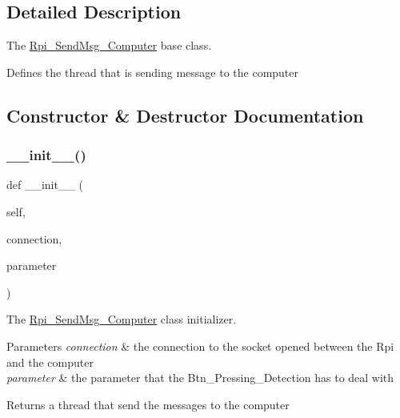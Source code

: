 \subsection{Detailed Description}
The \hyperlink{a00045}{Rpi\+\_\+\+Send\+Msg\+\_\+\+Computer} base class. 

Defines the thread that is sending message to the computer 

\subsection{Constructor \& Destructor Documentation}
\mbox{\label{a00045_ab31bcaed710c978236824fea1cc5c9f4}} 
\subsubsection{\texorpdfstring{\+\_\+\+\_\+init\+\_\+\+\_\+()}{\_\_init\_\_()}}
{\footnotesize\ttfamily def \+\_\+\+\_\+init\+\_\+\+\_\+ (\begin{DoxyParamCaption}\item[{}]{self,  }\item[{}]{connection,  }\item[{}]{parameter }\end{DoxyParamCaption})}



The \hyperlink{a00045}{Rpi\+\_\+\+Send\+Msg\+\_\+\+Computer} class initializer. 


\begin{DoxyParams}{Parameters}
{\em connection} & the connection to the socket opened between the Rpi and the computer \\
\hline
{\em parameter} & the parameter that the Btn\+\_\+\+Pressing\+\_\+\+Detection has to deal with \\
\hline
\end{DoxyParams}
\begin{DoxyReturn}{Returns}
a thread that send the messages to the computer 
\end{DoxyReturn}


